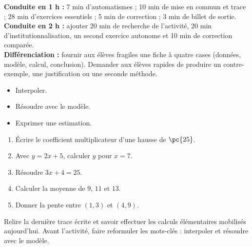 \ifmxteacher
\begin{method}
\textbf{Conduite en 1 h :} 7 min d'automatismes ; 10 min de mise en commun et trace ; 28 min d'exercices essentiels ; 5 min de correction ; 3 min de billet de sortie.\\
\textbf{Conduite en 2 h :} ajouter 20 min de recherche de l'activité, 20 min d'institutionnalisation, un second exercice autonome et 10 min de correction comparée.\\
\textbf{Différenciation :} fournir aux élèves fragiles une fiche à quatre cases (données, modèle, calcul, conclusion). Demander aux élèves rapides de produire un contre-exemple, une justification ou une seconde méthode.
\end{method}
\fi
{}
\begin{objectives}\begin{itemize}\item Interpoler.\item Résoudre avec le modèle.\item Exprimer une estimation.\end{itemize}\end{objectives}
\begin{fluency}\begin{enumerate}\item Écrire le coefficient multiplicateur d'une hausse de $\pc{25}$. \item Avec $y=2x+5$, calculer $y$ pour $x=7$. \item Résoudre $3x+4=25$. \item Calculer la moyenne de $9$, $11$ et $13$. \item Donner la pente entre $(1,3)$ et $(4,9)$. \end{enumerate}\end{fluency}
\begin{prerequisites}Relire la dernière trace écrite et savoir effectuer les calculs élémentaires mobilisés aujourd'hui. Avant l'activité, faire reformuler les mots-clés : interpoler et résoudre avec le modèle.\end{prerequisites}

